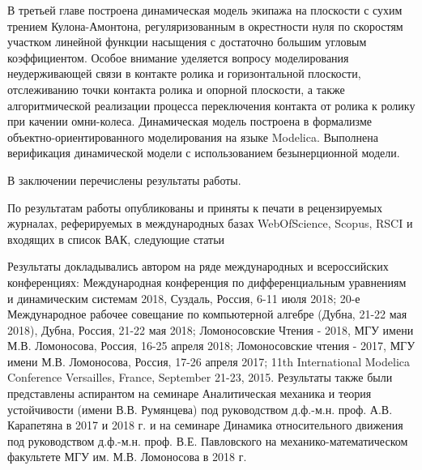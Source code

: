 В третьей главе построена динамическая модель экипажа на плоскости с сухим трением Кулона-Амонтона, регуляризованным в окрестности нуля по скоростям участком линейной функции насыщения с достаточно большим угловым коэффициентом. Особое внимание уделяется вопросу моделирования неудерживающей связи в контакте ролика и горизонтальной плоскости, отслеживанию точки контакта ролика и опорной плоскости, а также алгоритмической реализации процесса переключения контакта от ролика к ролику при качении омни-колеса. Динамическая модель построена в формализме объектно-ориентированного моделирования на языке Modelica. Выполнена верификация динамической модели с использованием безынерционной модели.

В заключении перечислены результаты работы.

По результатам работы опубликованы и приняты к печати в рецензируемых журналах, реферируемых в международных базах WebOfScience, Scopus, RSCI и входящих в список ВАК, следующие статьи \cite{KosenkoGerasimovNd2016,GerasimovZobovaPMM2018,GerasimovZobovaTrudyMAI2018,KosenkoGerasimovJsme2016,KosenkoGerasimov2015,Kosenko201construction}

Результаты докладывались автором на ряде международных и всероссийских конференциях: Международная конференция по дифференциальным уравнениям и динамическим системам 2018, Суздаль, Россия, 6-11 июля 2018; 20-е Международное рабочее совещание по компьютерной алгебре (Дубна, 21-22 мая 2018), Дубна, Россия, 21-22 мая 2018; Ломоносовские Чтения - 2018, МГУ имени М.В. Ломоносова, Россия, 16-25 апреля 2018; Ломоносовские чтения - 2017, МГУ имени М.В. Ломоносова, Россия, 17-26 апреля 2017; 11th International Modelica Conference Versailles, France, September 21-23, 2015. Результаты также были представлены аспирантом на семинаре Аналитическая механика и теория устойчивости (имени В.В. Румянцева) под руководством д.ф.-м.н. проф. А.В. Карапетяна в 2017 и 2018 г. и на семинаре Динамика относительного движения под руководством д.ф.-м.н. проф. В.Е. Павловского на механико-математическом факультете МГУ им. М.В. Ломоносова в 2018 г.